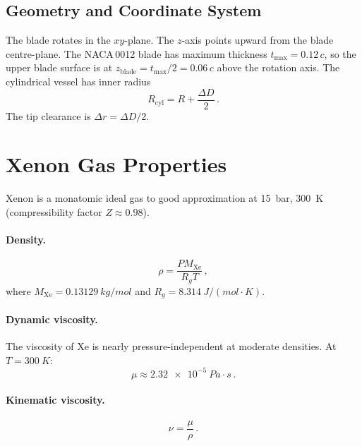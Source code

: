 \documentclass[11pt,a4paper]{article}
\begin{document}
\subsection{Geometry and Coordinate System}

The blade rotates in the $xy$-plane. The $z$-axis points upward from
the blade centre-plane. The NACA\,0012 blade has maximum thickness
$t_\mathrm{max} = 0.12\,c$, so the upper blade surface is at
$z_\mathrm{blade} = t_\mathrm{max}/2 = 0.06\,c$ above the rotation
axis. The cylindrical vessel has inner radius
\begin{equation}
  R_\mathrm{cyl} = R + \frac{\Delta D}{2}\,.
\end{equation}
The tip clearance is $\Delta r = \Delta D / 2$.


\section{Xenon Gas Properties}
\label{sec:gas}

Xenon is a monatomic ideal gas to good approximation at \SI{15}{bar},
\SI{300}{K} (compressibility factor $Z \approx 0.98$).

\paragraph{Density.}
\begin{equation}
  \rho = \frac{P M_\mathrm{Xe}}{R_g T}\,,
  \label{eq:density}
\end{equation}
where $M_\mathrm{Xe} = \SI{0.13129}{kg/mol}$ and
$R_g = \SI{8.314}{J/(mol\cdot K)}$.

\paragraph{Dynamic viscosity.}
The viscosity of Xe is nearly pressure-independent at moderate densities.
At $T = \SI{300}{K}$:
\begin{equation}
  \mu \approx \SI{2.32e-5}{Pa\cdot s}\,.
\end{equation}

\paragraph{Kinematic viscosity.}
\begin{equation}
  \nu = \frac{\mu}{\rho}\,.
  \label{eq:nu}
\end{equation}
\end{document}
